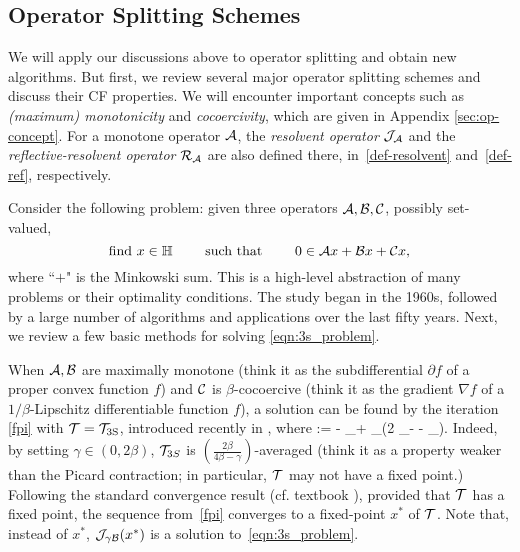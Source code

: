 \subsection{Operator Splitting Schemes}\label{sec:splitting}
We will apply our discussions above to operator splitting and  obtain new algorithms. But first, we review several major operator splitting schemes and discuss their CF properties. We will encounter important concepts such as \emph{(maximum) monotonicity} and \emph{cocoercivity}, which are given in Appendix \ref{sec:op-concept}. For a monotone  operator ${\mathcal{A}}$, the \emph{resolvent operator} ${\mathcal{J}}_{{\mathcal{A}}}$ and the \emph{reflective-resolvent operator}  ${\mathcal{R}}_{{\mathcal{A}}}$ are also defined there, in~\eqref{def-resolvent} and~\eqref{def-ref}, respectively.   %

Consider the following problem: given three operators ${\mathcal{A}},{\mathcal{B}},{\mathcal{C}}$, possibly set-valued,  \begin{equation}\label{eqn:3s_problem}
\text{find } x \in \HH \qquad \text{ such that }  \qquad 0 \in \cA x + \cB x +\cC x,
\end{equation}
where ``$+$" is the Minkowski sum.
This is a high-level abstraction of many problems or their optimality conditions. The study began in the 1960s, followed by a large number of algorithms and applications over the last fifty years. Next, we review a few basic methods for solving \eqref{eqn:3s_problem}.

When ${\mathcal{A}}, {\mathcal{B}}$ are maximally monotone (think it as the subdifferential $\partial f$ of a proper convex function $f$) and ${\mathcal{C}}$ is $\beta$-cocoercive (think it as the gradient $\nabla f$ of a $1/\beta$-Lipschitz differentiable function $f$),  a solution can be found by the iteration \eqref{fpi} with ${\mathcal{T}}={{\mathcal{T}}_{\mathrm{3S}}}$, introduced recently in \cite{davis2015three}, where  
\beq\label{3s}
\TS := \cI- \cJ_{\gamma \cB}+ \cJ_{\gamma \cA}\circ(2 \cJ_{\gamma \cB}- \cI - \gamma \cC\circ \cJ_{\gamma \cB}).
\eeq {}Indeed, by setting  $\gamma\in(0,2\beta)$, ${\mathcal{T}}_{3S}$ is $(\frac{2\beta}{4\beta-\gamma})$-averaged (think it as a property weaker than the Picard contraction; in particular,  ${\mathcal{T}}$ may not have a fixed point.) Following the standard convergence result (cf. textbook \cite{bauschke2011convex}), provided that ${\mathcal{T}}$ has a  fixed point, the sequence from~\eqref{fpi} converges to a fixed-point $x^*$ of ${\mathcal{T}}$. Note that, instead of $x^*$, ${\mathcal{J}}_{\gamma{\mathcal{B}}}(x^*)$ is a solution to~\eqref{eqn:3s_problem}.  

